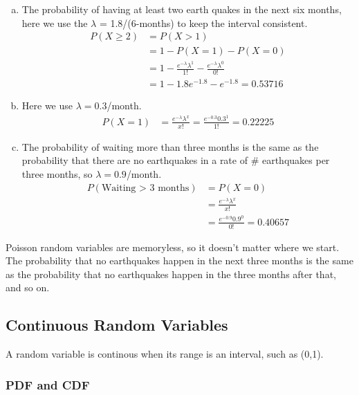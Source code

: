 \documentclass{report}
\begin{document}
\begin{enumerate}[(a)]
\item The probability of having at least two earth quakes in the next six months, here we use the $\lambda$ = 1.8/(6-months) to keep the interval consistent.
\begin{align*}
P(X \geq 2) & = P(X > 1) \\
& = 1 - P(X=1) - P(X = 0) \\
& = 1 - \frac{e^{-\lambda}\lambda^1}{1!} - \frac{e^{-\lambda}\lambda^0}{0!}\\
& = 1 - 1.8e^{-1.8} - e^{-1.8} = \boxed{0.53716}
\end{align*}
\item Here we use $\lambda=0.3$/month. \begin{align*} 
P(X = 1) & =  \frac{e^{-\lambda}\lambda^x}{x!} = \frac{e^{-0.3}0.3^1}{1!} = \boxed{0.22225}
\end{align*}
\item  The probability of waiting more than three months is the same as the probability that there are no earthquakes in a rate of \# earthquakes per three months, so $\lambda = 0.9$/month. \begin{align*} 
P(\text{Waiting > 3 months}) & =  P(X = 0) \\
& = \frac{e^{-\lambda}\lambda^x}{x!} \\
& = \frac{e^{-0.9}0.9^0}{0!} = \boxed{0.40657} 
\end{align*}
\end{enumerate}

Poisson random variables are memoryless, so it doesn't matter where we start. The probability that no earthquakes happen in the next three months is the same as the probability that no earthquakes happen in the three months after that, and so on.








\subsection{Continuous Random Variables}

A random variable is continous when its range is an interval, such as (0,1). 

\subsubsection{PDF and CDF}
\end{document}

